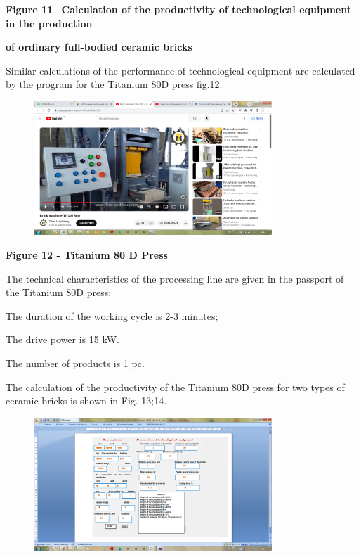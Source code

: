 {\bfseries Figure 11−Calculation of the productivity of technological
equipment in the production}

{\bfseries of ordinary full-bodied ceramic bricks}

Similar calculations of the performance of technological equipment are
calculated by the program for the Titanium 80D press fig.12.

\begin{figure}[H]
	\centering
	\includegraphics[width=0.8\textwidth]{assets/278}
	\caption*{}
\end{figure}

{\bfseries Figure 12 - Titanium 80 D Press}

The technical characteristics of the processing line are given in the
passport of the Titanium 80D press:

The duration of the working cycle is 2-3 minutes;

The drive power is 15 kW.

The number of products is 1 pc.

The calculation of the productivity of the Titanium 80D press for two
types of ceramic bricks is shown in Fig. 13;14.

\begin{figure}[H]
	\centering
	\includegraphics[width=0.8\textwidth]{assets/279}
	\caption*{}
\end{figure}

